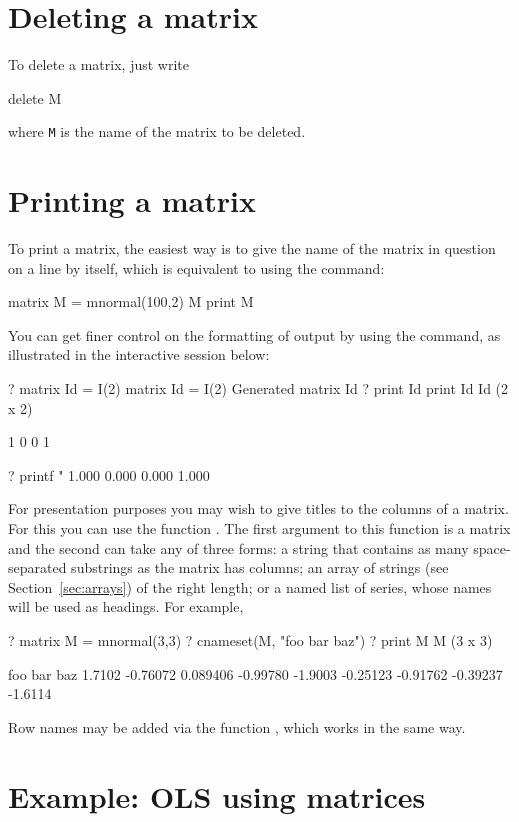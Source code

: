 \section{Deleting a matrix}
\label{matrix-delete}

To delete a matrix, just write
%
\begin{code}
delete M
\end{code}
%
where \texttt{M} is the name of the matrix to be deleted.

\section{Printing a matrix}

To print a matrix, the easiest way is to give the name of the matrix
in question on a line by itself, which is equivalent to using the
 command:
%
\begin{code}
matrix M = mnormal(100,2)
M
print M
\end{code}

You can get finer control on the formatting of output by using the
 command, as illustrated in the interactive session below:
%
\begin{code}
? matrix Id = I(2)
 matrix Id = I(2)
Generated matrix Id
? print Id
 print Id
Id (2 x 2)

  1   0 
  0   1 

? printf "%
     1.000     0.000
     0.000     1.000
\end{code}

For presentation purposes you may wish to give titles to the columns
of a matrix.  For this you can use the function . The
first argument to this function is a matrix and the second can take
any of three forms: a string that contains as many space-separated
substrings as the matrix has columns; an array of strings (see
Section~\ref{sec:arrays}) of the right length; or a named list of
series, whose names will be used as headings.  For example,
%
\begin{code}
? matrix M = mnormal(3,3)
? cnameset(M, "foo bar baz")
? print M
M (3 x 3)

         foo          bar          baz 
      1.7102     -0.76072     0.089406 
    -0.99780      -1.9003     -0.25123 
    -0.91762     -0.39237      -1.6114
\end{code}
%
Row names may be added via the function , which works in
the same way.

\section{Example: OLS using matrices}
\label{matrix-example}

